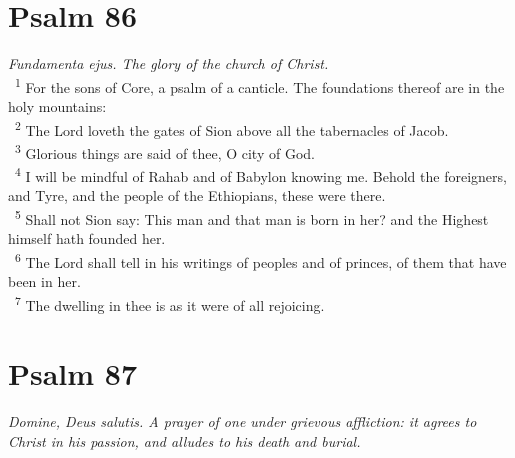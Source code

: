 \documentclass[a5paper,12pt]{article}
\begin{document}
\begin{multicols*}{2}
\section{Psalm 86}
\label{sec:org36da7e1}
\emph{Fundamenta ejus. The glory of the church of Christ.}\\

~\textsuperscript{1} For the sons of Core, a psalm of a canticle. The foundations thereof are in the holy mountains:\\
~\textsuperscript{2} The Lord loveth the gates of Sion above all the tabernacles of Jacob.\\
~\textsuperscript{3} Glorious things are said of thee, O city of God.\\
~\textsuperscript{4} I will be mindful of Rahab and of Babylon knowing me. Behold the foreigners, and Tyre, and the people of the Ethiopians, these were there.\\
~\textsuperscript{5} Shall not Sion say: This man and that man is born in her? and the Highest himself hath founded her.\\
~\textsuperscript{6} The Lord shall tell in his writings of peoples and of princes, of them that have been in her.\\
~\textsuperscript{7} The dwelling in thee is as it were of all rejoicing.\\

\section{Psalm 87}
\label{sec:orgaea6650}
\emph{Domine, Deus salutis. A prayer of one under grievous affliction: it agrees to Christ in his passion, and alludes to his death and burial.}\\


\end{multicols*}
\end{document}
